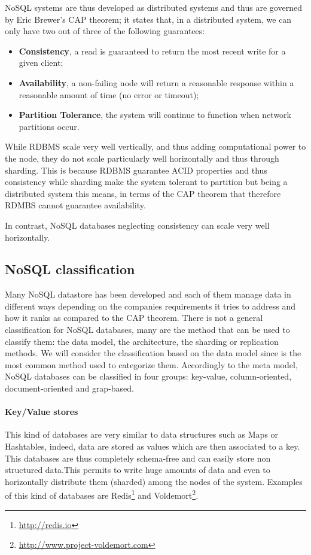 \noindent NoSQL systems are thus developed as distributed systems and thus are governed by Eric Brewer's CAP theorem; it states that, in a distributed system, we can only have two out of three of the following guarantees:
\begin{itemize}
\item \textbf{Consistency}, a read is guaranteed to return the most recent write for a given client;
\item \textbf{Availability}, a non-failing node will return a reasonable response within a reasonable amount of time (no error or timeout);
\item \textbf{Partition Tolerance}, the system will continue to function when network partitions occur.
\end{itemize}

\noindent While RDBMS scale very well vertically, and thus adding computational power to the node, they do not scale particularly well horizontally and thus through sharding. This is because RDBMS guarantee ACID properties and thus consistency while sharding make the system tolerant to partition but being a distributed system this means, in terms of the CAP theorem that therefore RDMBS cannot guarantee availability.

\noindent In contrast, NoSQL databases neglecting consistency can scale very well horizontally.


\subsection{NoSQL classification}
Many NoSQL datastore has been developed and each of them manage data in different ways depending on the companies requirements it tries to address and how it ranks as compared to the CAP theorem.
There is not a general classification for NoSQL databases, many are the method that can be used to classify them: the data model, the architecture, the sharding or replication methods. We will consider the classification based on the data model since is the most common method used to categorize them.
Accordingly to the meta model, NoSQL databases can be classified in four groups: key-value, column-oriented, document-oriented and grap-based.

\paragraph{Key/Value stores} 
This kind of databases are very similar to data structures such as Maps or Hashtables, indeed, data are stored as values which are then associated to a key. This databases are thus completely schema-free and can easily store non structured data.This permits to write huge amounts of data and even to horizontally distribute them (sharded) among the nodes of the system.
Examples of this kind of databases are Redis\footnote{\url{http://redis.io}} and Voldemort\footnote{\url{http://www.project-voldemort.com}}.

